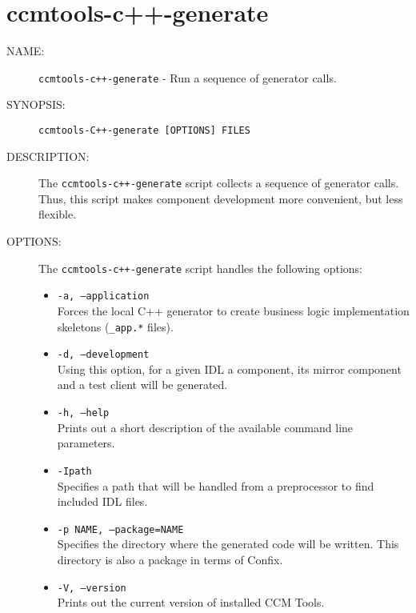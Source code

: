 \section{ccmtools-c++-generate}
\begin{description}

\item [NAME:] 
  {\tt ccmtools-c++-generate} - Run a sequence of generator calls.

\item [SYNOPSIS:] 
  {\tt ccmtools-C++-generate [OPTIONS] FILES}

\item [DESCRIPTION:]
  The {\tt ccmtools-c++-generate} script collects a sequence of 
  generator calls. 
  Thus, this script makes component development more convenient,
  but less flexible.   


\item [OPTIONS:]
  The {\tt ccmtools-c++-generate} script handles the following options:
  \begin{itemize}
  \item {\tt -a, --application} \\
    Forces the local C++ generator to create business logic
    implementation skeletons ({\tt *\_app.*} files).

  \item {\tt -d, --development} \\
    Using this option, for a given IDL a component, its mirror component
    and a test client will be generated.

  \item {\tt -h, --help} \\
    Prints out a short description of the available command line parameters.

  \item {\tt -Ipath} \\
    Specifies a path that will be handled from a preprocessor to find 
    included IDL files.

  \item {\tt -p NAME, --package=NAME} \\
    Specifies the directory where the generated code will be written. 
    This directory is also a package in terms of Confix.  

  \item {\tt -V, --version} \\
    Prints out the current version of installed CCM Tools.
  \end{itemize}
  

\end{description}
